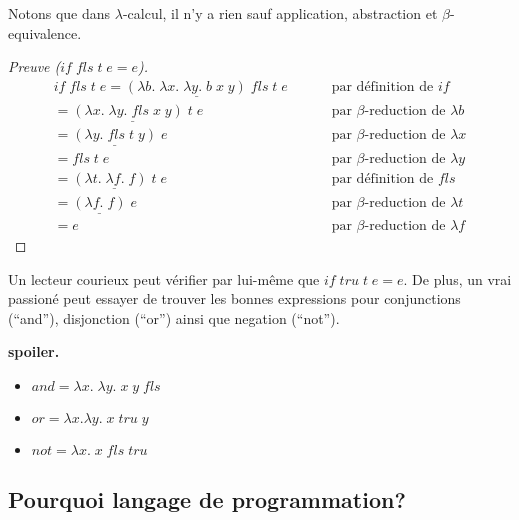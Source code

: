 \documentclass[12pt, a4paper]{article}
\begin{document}
Notons que dans $\lambda$-calcul, il n'y a rien sauf application, abstraction et $\beta$-equivalence.
\begin{proof}[Preuve ($if \; fls \; t \; e = e$)]
	\begin{eqnarray*}
		if \; fls \; t \; e
		= \underline{(\lambda b. \; \lambda x. \; \lambda y. \; b \; x \; y) \; fls} \; t \; e
			& \qquad \text{ par définition de $if$}\\ 
		= \underline{(\lambda x. \; \lambda y. \; fls \; x \; y) \; t} \; e
			& \qquad \text{ par $\beta$-reduction de $\lambda b$}\\
		= \underline{(\lambda y. \; fls \; t \; y)} \; e
			& \qquad \text{ par $\beta$-reduction de $\lambda x$}\\
		= fls \; t \; e
			& \qquad \text{ par $\beta$-reduction de $\lambda y$}\\
		= \underline{(\lambda t. \; \lambda f. \; f) \; t} \; e
			& \qquad \text{ par définition de $fls$}\\
		= \underline{(\lambda f. \; f)} \; e
			& \qquad \text{ par $\beta$-reduction de $\lambda t$}\\
		= e
			& \qquad \text{ par $\beta$-reduction de $\lambda f$}
	\end{eqnarray*}
\end{proof}
Un lecteur courieux peut vérifier par lui-même que $if \; tru \; t \; e = e$.
De plus, un vrai passioné peut essayer de trouver les bonnes expressions pour conjunctions (``and''), disjonction (``or'') ainsi que negation (``not'').

\textbf{spoiler.} 
\begin{itemize}
	\item $and = \lambda x. \; \lambda y. \; x \; y \; fls$
	\item $or = \lambda x. \lambda y. \; x \; tru \; y$
	\item $not = \lambda x. \; x \; fls \; tru$
\end{itemize}

\subsection*{Pourquoi langage de programmation?}
\end{document}
